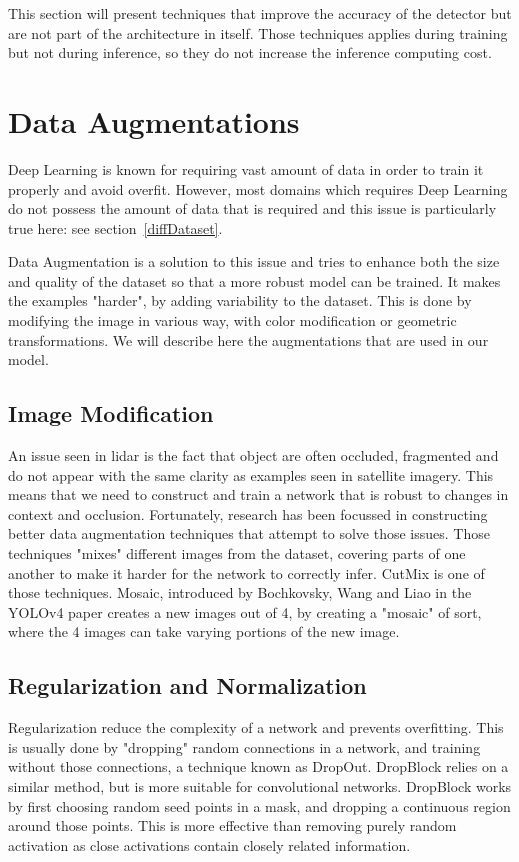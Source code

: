 This section will present techniques that improve the accuracy of the detector but are not part of the architecture in itself. Those techniques applies during training but not during inference, so they do not increase the inference computing cost.

\section{Data Augmentations}
Deep Learning is known for requiring vast amount of data in order to train it properly and avoid \gls{overfit}\cite{shorten2019}. However, most domains which requires Deep Learning do not possess the amount of data that is required and this issue is particularly true here: see section~\ref{diffDataset}.  

Data Augmentation is a solution to this issue and tries to enhance both the size and quality of the dataset so that a more robust model can be trained. It makes the examples "harder", by adding variability to the dataset. This is done by modifying the image in various way, with color modification or geometric transformations. We will describe here the augmentations that are used in our model.

\subsection{Image Modification}
An issue seen in \gls{lidar} is the fact that object are often occluded, fragmented and do not appear with the same clarity as examples seen in satellite imagery. This means that we need to construct and train a network that is robust to changes in context and occlusion. Fortunately, research has been focussed in constructing better data augmentation techniques that attempt to solve those issues. Those techniques "mixes" different images from the dataset, covering parts of one another to make it harder for the network to correctly infer. CutMix\cite{cutMix} is one of those techniques. Mosaic, introduced by Bochkovsky, Wang and Liao in the YOLOv4 paper\cite{yolov4} creates a new images out of 4, by creating a "mosaic" of sort, where the 4 images can take varying portions of the new image. 

\subsection{Regularization and Normalization}
Regularization reduce the complexity of a network and prevents overfitting. This is usually done by "dropping" random connections in a network, and training without those connections, a technique known as DropOut\cite{dropOut}. DropBlock\cite{dropBlock} relies on a similar method, but is more suitable for convolutional networks. DropBlock works by first choosing random seed points in a mask, and dropping a continuous region around those points. This is more effective than removing purely random activation as close activations contain closely related information.

